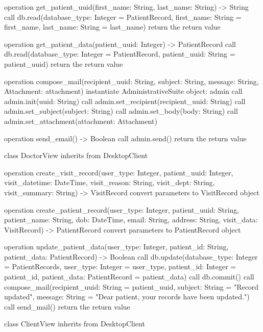 \documentclass[a4paper, 11pt]{article}
\begin{document}
\begin{appendices}
\begin{pseudocode}[caption={DesktopClient Entity Class}, label={desktop}]
{  operation get_patient_uuid(first_name: String, last_name: String) -> String {
    call db.read(database_type: Integer = PatientRecord, first_name: String = first_name, last_name: String = last_name)
    return the return value
  }

  operation get_patient_data(patient_uuid: Integer) -> PatientRecord {
    call db.read(database_type: Integer = PatientRecord, patient_uuid: String = patient_uuid)
    return the return value
  }

  operation compose_mail(recipient_uuid: String, subject: String, message: String, Attachment: attachment) {
    instantiate AdministrativeSuite object: admin
    call admin.init(uuid: String)
    call admin.set_recipient(recipient_uuid: String)
    call admin.set_subject(subject: String)
    call admin.set_body(body: String)
    call admin.set_attachment(attachment: Attachment)
  }

  operation send_email() -> Boolean {
    call admin.send()
    return the return value
  }
}
\end{pseudocode}

\begin{pseudocode}[caption={DoctorView Derived Entity Class}, label={doctor}]
class DoctorView inherits from DesktopClient {

  operation create_visit_record(user_type: Integer, patient_uuid: Integer, visit_datetime: DateTime, 
    visit_reason: String, visit_dept: String, visit_summary: String) -> VisitRecord {
    convert parameters to VisitRecord object
  }

  operation create_patient_record(user_type: Integer, patient_uuid: String, patient_name: String,
    dob: DateTime, email: String, address: String, visit_data: VisitRecord) -> PatientRecord {
    convert parameters to PatientRecord object
  }

  operation update_patient_data(user_type: Integer, patient_id: String, patient_data: PatientRecord) -> Boolean {
    call db.update(database_type: Integer = PatientRecords, user_type: Integer = user_type,
      patient_id: Integer = patient_id, patient_data: PatientRecord = patient_data)
    call db.commit()
    call compose_mail(recipient_uuid: String = patient_uuid, subject: String = "Record updated",
      message: String = "Dear patient, your records have been updated.\n")
    call send_mail()
    return the return value
  }

}
\end{pseudocode}
\begin{pseudocode}[caption={ClientView Derived Entity Class}, label={client}]
class ClientView inherits from DesktopClient {

}
\end{pseudocode}
\end{appendices}
\end{document}
